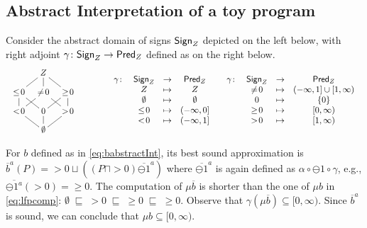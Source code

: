 \documentclass{llncs}
\begin{document}
\subsection{Abstract Interpretation of a toy program}\label{ssec:AItoy}
%
Consider the abstract domain of signs $\mathsf{Sign}_Z$ depicted on the left below, with right adjoint $\gamma\colon \mathsf{Sign}_Z \to \mathsf{Pred}_Z$ defined as on the right below. 
$$
\begin{array}{ccc}
{\lower-1.2cm\hbox{\xymatrix@R=0.3cm@C=0.3cm{ & Z &\\
\leq \!0 \ar@{-}[ur]  & \neq \!0 \ar@{-}[u]   &\geq \!0 \ar@{-}[ul] \\
< \!0 \ar@{-}[u] \ar@{-}[ur]  & 0 \ar@{-}[ur]\ar@{-}[ul]& > \!0 \ar@{-}[ul]  \ar@{-}[u]\\
& \emptyset \ar@{-}[ur] \ar@{-}[ul] \ar@{-}[u]}
}}\hspace{1cm}
&
\begin{array}{cccc}
\gamma\colon  & \Sign_Z & \to & \Pred_Z \\
& Z &\mapsto &Z\\
& \emptyset &\mapsto &\emptyset\\
& \leq \!0 &\mapsto &(-\infty, 0]\\
& < \!0 &\mapsto &(-\infty, 1]\\
\end{array}
&
\begin{array}{cccc}
\gamma\colon  & \Sign_Z & \to & \Pred_Z \\
& \neq \!0 &\mapsto & (-\infty, 1] \cup [1,\infty)\\
& 0 &\mapsto & \{0\} \\
& \geq \!0 &\mapsto &[0,\infty)\\
& > \!0 &\mapsto &[1,\infty)\\
\end{array}
\end{array}
$$

For $b$ defined as in \eqref{eq:babstractInt}, its best sound approximation is $\overline{b}^a(P)=  > \!0 \sqcup ((P\sqcap >\!0)\overline{\ominus\!1}^a)$ where $\overline{\ominus \!1}^a$ is again defined as $\alpha \circ \ominus \!1 \circ \gamma$, e.g.,  $\overline{\ominus \!1^a}(>\!0)= \geq \!0$. The computation of $\mu \overline{b}$ is shorter than the one of $\mu b$ in \eqref{eq:lfpcomp}:
$\emptyset \; \sqsubseteq\; >\!0 \;\sqsubseteq\; \geq\! 0 \;\sqsubseteq \; \geq\! 0$. Observe that $\gamma (\mu \overline{b}) \subseteq [0,\infty)$. Since $\overline{b}^a$ is sound, we can conclude that $\mu b \subseteq [0,\infty)$.
\end{document}

